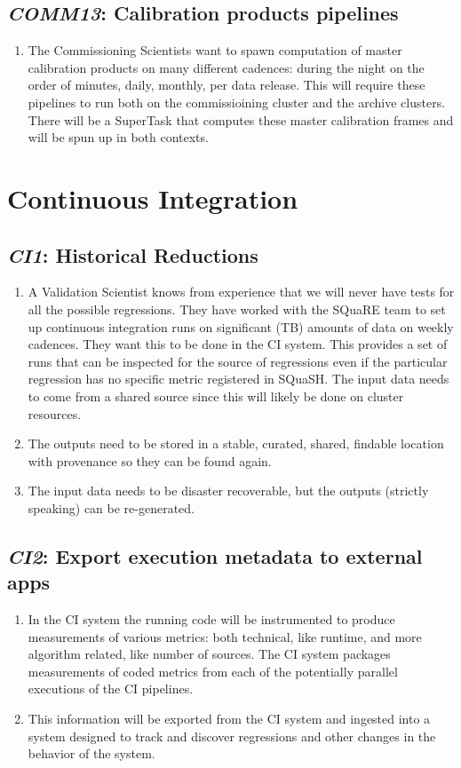 \documentclass[DM,toc,lsstdraft]{lsstdoc}
\newcommand{\usecase}[3]{%
\subsection{\emph{#1}: #2}
\label{use:#1}
\begin{enumerate}[label=\alph*.]
#3
\end{enumerate}
}
\begin{document}
\usecase{COMM13}{Calibration products pipelines}{%

\item
The Commissioning Scientists want to spawn computation of master calibration products on many different cadences: during the night on the order of minutes, daily, monthly, per data release.
This will require these pipelines to run both on the commissioining cluster and the archive clusters.
There will be a SuperTask that computes these master calibration frames and will be spun up in both contexts.

}

\section{Continuous Integration}

\usecase{CI1}{Historical Reductions}{%

\item
A Validation Scientist knows from experience that we will never have tests for all the possible regressions.
They have worked with the SQuaRE team to set up continuous integration runs on significant (TB) amounts of data on weekly cadences.
They want this to be done in the CI system.
This provides a set of runs that can be inspected for the source of regressions even if the particular regression has no specific metric registered in SQuaSH.
The input data needs to come from a shared source since this will likely be done on cluster resources.

\item
The outputs need to be stored in a stable, curated, shared, findable location with provenance so they can be found again.

\item
The input data needs to be disaster recoverable, but the outputs (strictly speaking) can be re-generated.

}

\usecase{CI2}{Export execution metadata to external apps}{%

\item
In the CI system the running code will be instrumented to produce measurements of various metrics: both technical, like runtime, and more algorithm related, like number of sources.
The CI system packages measurements of coded metrics from each of the potentially parallel executions of the CI pipelines.

\item
This information will be exported from the CI system and ingested into a system designed to track and discover regressions and other changes in the behavior of the system.

}
\end{document}
